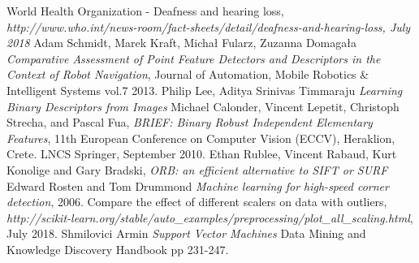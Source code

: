 \documentclass[11pt,a4paper]{article}
\begin{document}
\begin{thebibliography}{99}
 \setlength\baselineskip{5pt}
%

World Health Organization - Deafness and hearing loss,
\textit{http://www.who.int/news-room/fact-sheets/detail/deafness-and-hearing-loss, July 2018}
Adam Schmidt, Marek Kraft, Micha\l $ $ Fularz, Zuzanna Domaga\l a 
\textit{Comparative Assessment of Point Feature Detectors and Descriptors in the Context of Robot Navigation},
Journal of Automation, Mobile Robotics \& Intelligent Systems vol.7 2013.
Philip Lee, Aditya Srinivas Timmaraju 
\textit{Learning Binary Descriptors from Images}
Michael Calonder, Vincent Lepetit, Christoph Strecha, and Pascal Fua, 
\textit{BRIEF: Binary Robust Independent Elementary Features}, 11th European Conference on Computer Vision (ECCV), Heraklion, Crete. LNCS Springer, September 2010.
Ethan Rublee, Vincent Rabaud, Kurt Konolige and Gary Bradski, 
\textit{ORB: an efficient alternative to SIFT or SURF}
 Edward Rosten and Tom Drummond
\textit{Machine learning for high-speed corner detection},
 2006.
Compare the effect of different scalers on data with outliers,
\textit{http://scikit-learn.org/stable/auto\_examples/preprocessing/plot\_all\_scaling.html},
July 2018.
 Shmilovici Armin \textit{Support Vector Machines} Data Mining and Knowledge Discovery Handbook pp 231-247.


\end{thebibliography}
\end{document}
